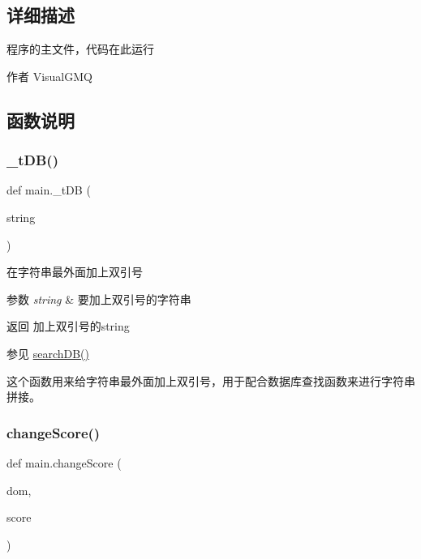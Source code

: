 \subsection{详细描述}
程序的主文件，代码在此运行 

\begin{DoxyAuthor}{作者}
Visual\+G\+MQ 
\end{DoxyAuthor}


\subsection{函数说明}
\mbox{\label{namespacemain_a39677d63980368745619bcd32200e768}} 
\subsubsection{\texorpdfstring{\_tDB()}{\_tDB()}}
{\footnotesize\ttfamily def main.\+\_\+t\+DB (\begin{DoxyParamCaption}\item[{}]{string }\end{DoxyParamCaption})\hspace{0.3cm}{\ttfamily [private]}}



在字符串最外面加上双引号 


\begin{DoxyParams}{参数}
{\em string} & 要加上双引号的字符串 \\
\hline
\end{DoxyParams}
\begin{DoxyReturn}{返回}
加上双引号的string 
\end{DoxyReturn}
\begin{DoxySeeAlso}{参见}
\mbox{\hyperlink{namespacemain_a8349c6affc6efc18c9afef83fec85e48}{search\+D\+B()}}
\end{DoxySeeAlso}
这个函数用来给字符串最外面加上双引号，用于配合数据库查找函数来进行字符串拼接。 \mbox{\label{namespacemain_a4f4216d6a8208604c32b24da5feeaf68}} 
\subsubsection{\texorpdfstring{changeScore()}{changeScore()}}
{\footnotesize\ttfamily def main.\+change\+Score (\begin{DoxyParamCaption}\item[{}]{dom,  }\item[{}]{score }\end{DoxyParamCaption})}



